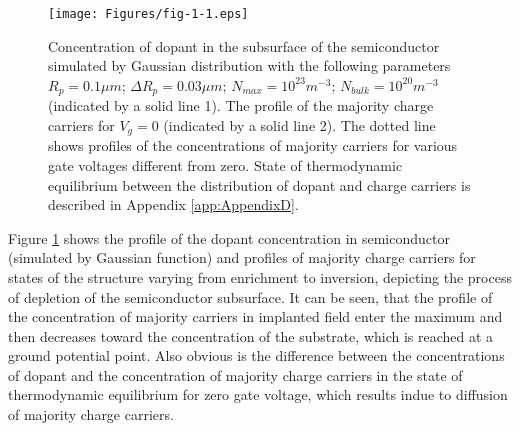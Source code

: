 \begin{figure}[h!]\centering
\texttt{[image: Figures/fig-1-1.eps]}
\captionsetup{justification=raggedright, singlelinecheck=false}
\iffalse
\caption[Priebeh koncentrácie prímesí v podpovrchovej oblasti
  polovodiča]{Priebeh koncentrácie prímesí v podpovrchovej oblasti
  polovodiča simulovaný Gaussovským rozložením \cite{1.11} s
  následovnými parametrami $R_p=0.1 \mu{m}$; $\Delta{R_p}=0.03
  \mu{m}$; $N_{max}=10^{23} m^{-3}$; $N_{bulk}=10^{20} m^{-3}$
  (označený plnou čiarou 1). Priebeh majoritných nosičov náboja pre
  $V_g=0$ (označený plnou čiarou 2). Bodkovanými čiarami sú znázornené
  priebehy koncentrácií majoritných nosičov pre napätia hradla rôzne
  od nuly. Stav termodynamickej rovnováhy medzi rozložením prímesí a
  nosičov náboja je popísaný v dodatku \ref{app:AppendixD}.}
\fi
\caption[Concentration of dopant in the subsurface of the
  semiconductor] {Concentration of dopant in the subsurface of the
  semiconductor simulated by Gaussian distribution \cite{1.11} with
  the following parameters $R_p=0.1 \mu{m}$; $\Delta{R_p}=0.03\mu{m}$;
  $N_{max}=10^{23} m^{-3}$; $N_{bulk}=10^{20} m^{-3}$ (indicated by a
  solid line 1). The profile of the majority charge carriers for
  $V_g=0$ (indicated by a solid line 2). The dotted line shows
  profiles of the concentrations of majority carriers for various gate
  voltages different from zero. State of thermodynamic equilibrium
  between the distribution of dopant and charge carriers is described
  in Appendix \ref{app:AppendixD}.}
\label{fig:1.1}
\end{figure}

\iffalse
\par Na obrázku \ref{fig:1.1} je znázornený priebeh koncentrácie
prímesí v polovodiči (simulovaný Gaussovským priebehom) a priebehy
majoritných nosičov náboja pre stav štruktúry meniaci sa od obohatenia
do inverzie, znázorňujúce dej ochudobňovania podpovrchovej oblasti
polovodiča. Tu vidieť, že priebeh koncentrácie majoritných nosičov v
implantovanej oblasti nadobúda maximum a potom klesá ku koncentrácii
substrátu, ktorú dosiahne v bode nulového elektrického potenciálu.
Zároveň je zrejmý rozdiel medzi priebehom koncentrácie prímesí a
priebehom koncentrácie majoritných nosičov náboja v stave
termodynamickej rovnováhy pre nulové napätie hradla, ktorý vzniká v
dôsledku difúzie majoritných nosičov náboja.
\fi
\par Figure \ref{fig:1.1} shows the profile of the dopant
concentration in semiconductor (simulated by Gaussian function) and
profiles of majority charge carriers for states of the structure
varying from enrichment to inversion, depicting the process of
depletion of the semiconductor subsurface. It can be seen, that the
profile of the concentration of majority carriers in implanted field
enter the maximum and then decreases toward the concentration of the
substrate, which is reached at a ground potential point. Also obvious
is the difference between the concentrations of dopant and the
concentration of majority charge carriers in the state of
thermodynamic equilibrium for zero gate voltage, which results indue
to diffusion of majority charge carriers.

